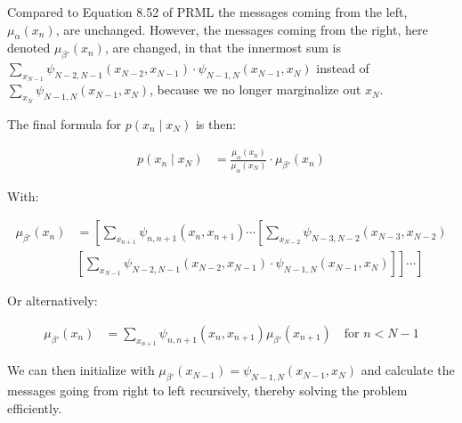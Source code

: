 \documentclass[a4paper, 12pt]{article}
\begin{document}
Compared to Equation 8.52 of PRML the messages coming from the left, $\mu_{\alpha}\left(x_{n}\right)$, are unchanged. However, the messages coming from the right, here denoted $\mu_{\beta'}\left(x_{n}\right)$, are changed, in that the innermost sum is $\sum_{x_{N-1}} \psi_{N-2, N-1}\left(x_{N-2}, x_{N-1}\right) \cdot \psi_{N-1, N}\left(x_{N-1}, x_{N}\right)$ instead of $\sum_{x_{N}} \psi_{N-1, N}\left(x_{N-1}, x_{N}\right)$, because we no longer marginalize out $x_N$. 

The final formula for $p(x_n \mid x_N)$ is then:

\begin{align}
	p(x_n \mid x_N) &= \frac{\mu_{\alpha}\left(x_{n}\right)}{\mu_{\alpha}(x_N)} \cdot \mu_{\beta'}\left(x_{n}\right)
\end{align}

With:

\begin{align}
	\mu_{\beta'}\left(x_{n}\right) &= \left[\sum_{x_{n+1}} \psi_{n, n+1}\left(x_{n}, x_{n+1}\right) \cdots  \left[\sum_{x_{N-2}} \psi_{N-3, N-2}\left(x_{N-3}, x_{N-2}\right)\right.\right.\\
	&\left.\left.\left[\sum_{x_{N-1}} \psi_{N-2, N-1}\left(x_{N-2}, x_{N-1}\right) \cdot \psi_{N-1, N}\left(x_{N-1}, x_{N}\right)\right]\right] \cdots\right]
\end{align}

Or alternatively:

\begin{align}
	\mu_{\beta'}\left(x_{n}\right) &= \sum_{x_{n+1}} \psi_{n, n+1}\left(x_{n}, x_{n+1}\right)  \mu_{\beta'}\left(x_{n+1}\right) ~~~ \text{ for } n < N - 1
\end{align}

We can then initialize with $\mu_{\beta'}\left(x_{N - 1}\right) = \psi_{N-1, N}\left(x_{N-1}, x_{N}\right)$ and calculate the messages going from right to left recursively, thereby solving the problem efficiently.


\end{document}
